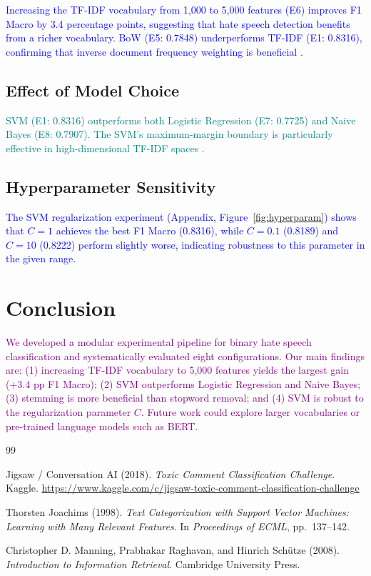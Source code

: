 \documentclass[11pt,a4paper,twocolumn]{article}
\newcommand{\authorone}[1]{\textcolor{blue}{#1}}      %
\newcommand{\authortwo}[1]{\textcolor{teal}{#1}}      %
\newcommand{\joint}[1]{\textcolor{purple}{#1}}        %
\begin{document}
\authorone{
Increasing the TF-IDF vocabulary from 1{,}000 to 5{,}000 features (E6)
improves F1 Macro by 3.4 percentage points, suggesting that hate speech
detection benefits from a richer vocabulary.
BoW (E5: 0.7848) underperforms TF-IDF (E1: 0.8316), confirming that
inverse document frequency weighting is beneficial \citep{manning2008}.
}

\subsection{Effect of Model Choice}

\authortwo{
SVM (E1: 0.8316) outperforms both Logistic Regression (E7: 0.7725) and
Naive Bayes (E8: 0.7907).
The SVM's maximum-margin boundary is particularly effective in
high-dimensional TF-IDF spaces \citep{joachims1998}.
}

\subsection{Hyperparameter Sensitivity}

\authorone{
The SVM regularization experiment (Appendix, Figure~\ref{fig:hyperparam})
shows that $C=1$ achieves the best F1 Macro (0.8316), while $C=0.1$
(0.8189) and $C=10$ (0.8222) perform slightly worse, indicating robustness
to this parameter in the given range.
}

\section{Conclusion}

\joint{
We developed a modular experimental pipeline for binary hate speech
classification and systematically evaluated eight configurations.
Our main findings are: (1) increasing TF-IDF vocabulary to 5{,}000 features
yields the largest gain (+3.4 pp F1 Macro); (2) SVM outperforms Logistic
Regression and Naive Bayes; (3) stemming is more beneficial than stopword
removal; and (4) SVM is robust to the regularization parameter $C$.
Future work could explore larger vocabularies or pre-trained language models
such as BERT.
}


\begin{thebibliography}{99}

Jigsaw / Conversation AI (2018).
\textit{Toxic Comment Classification Challenge}.
Kaggle.
\url{https://www.kaggle.com/c/jigsaw-toxic-comment-classification-challenge}

Thorsten Joachims (1998).
\textit{Text Categorization with Support Vector Machines: Learning with Many
Relevant Features}.
In \textit{Proceedings of ECML}, pp.~137--142.

Christopher D. Manning, Prabhakar Raghavan, and Hinrich Schütze (2008).
\textit{Introduction to Information Retrieval}.
Cambridge University Press.

\end{thebibliography}
\end{document}
